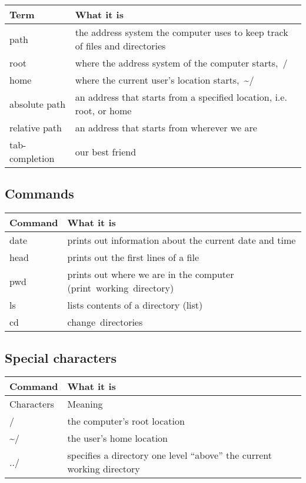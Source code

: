 \documentclass[
]{book}
\begin{document}
\begin{longtable}{ll}
\toprule
\textbf{Term} & \textbf{What it is}\\
\midrule
path & the address system the computer uses to keep track of files and directories\\
root & where the address system of the computer starts, /\\
home & where the current user’s location starts, \textasciitilde{}/\\
absolute path & an address that starts from a specified location, i.e. root, or home\\
relative path & an address that starts from wherever we are\\
\addlinespace
tab-completion & our best friend\\
\bottomrule
\end{longtable}

\hypertarget{commands}{%
\subsection{Commands}\label{commands}}

\begin{longtable}{ll}
\toprule
\textbf{Command} & \textbf{What it is}\\
\midrule
date & prints out information about the current date and time\\
head & prints out the first lines of a file\\
pwd & prints out where we are in the computer (print working directory)\\
ls & lists contents of a directory (list)\\
cd & change directories\\
\bottomrule
\end{longtable}

\hypertarget{special-characters}{%
\subsection{Special characters}\label{special-characters}}

\begin{longtable}{ll}
\toprule
\textbf{Command} & \textbf{What it is}\\
\midrule
Characters & Meaning\\
/ & the computer’s root location\\
\textasciitilde{}/ & the user’s home location\\
../ & specifies a directory one level “above” the current working directory\\
\bottomrule
\end{longtable}
\end{document}
